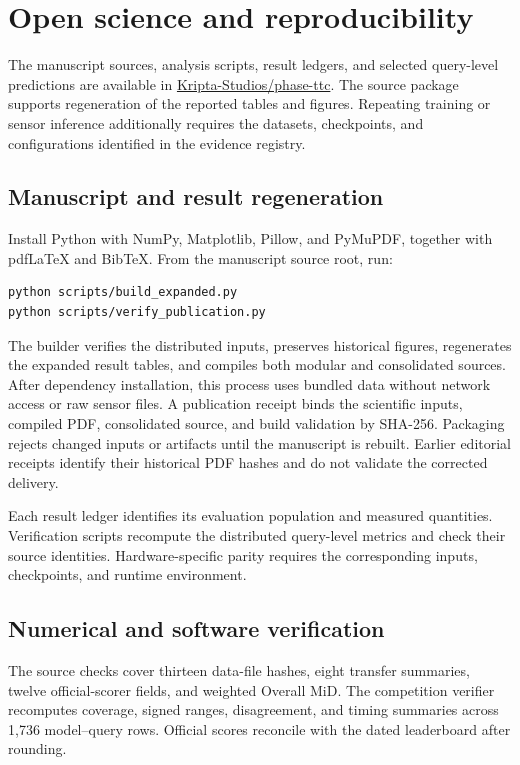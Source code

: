 \section{Open science and reproducibility}
\label{app:reproduction}

The manuscript sources, analysis scripts, result ledgers, and selected query-level predictions are available in \href{https://github.com/Kripta-Studios/phase-ttc}{Kripta-Studios/phase-ttc}. The source package supports regeneration of the reported tables and figures. Repeating training or sensor inference additionally requires the datasets, checkpoints, and configurations identified in the evidence registry.

\subsection{Manuscript and result regeneration}
Install Python with NumPy, Matplotlib, Pillow, and PyMuPDF, together with pdfLaTeX and BibTeX. From the manuscript source root, run:
\begin{lstlisting}
python scripts/build_expanded.py
python scripts/verify_publication.py
\end{lstlisting}
The builder verifies the distributed inputs, preserves historical figures, regenerates the expanded result tables, and compiles both modular and consolidated sources. After dependency installation, this process uses bundled data without network access or raw sensor files. A publication receipt binds the scientific inputs, compiled PDF, consolidated source, and build validation by SHA-256. Packaging rejects changed inputs or artifacts until the manuscript is rebuilt. Earlier editorial receipts identify their historical PDF hashes and do not validate the corrected delivery.

Each result ledger identifies its evaluation population and measured quantities. Verification scripts recompute the distributed query-level metrics and check their source identities. Hardware-specific parity requires the corresponding inputs, checkpoints, and runtime environment.

\subsection{Numerical and software verification}
The source checks cover thirteen data-file hashes, eight transfer summaries, twelve official-scorer fields, and weighted Overall MiD. The competition verifier recomputes coverage, signed ranges, disagreement, and timing summaries across 1,736 model--query rows. Official scores reconcile with the dated leaderboard after rounding.

